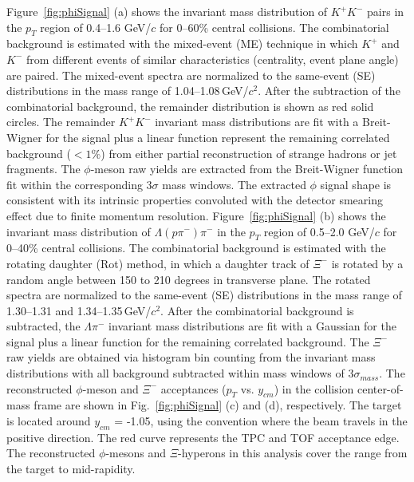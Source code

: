 \documentclass[%
 reprint,	
showpacs,
 amsmath,amssymb,
 aps,
 prc,
]{revtex4-1}
\begin{document}
Figure~\ref{fig:phiSignal} (a) shows the invariant mass distribution of $K^+K^-$ pairs in the $p_{T}$ region of 0.4--1.6 GeV/$c$ for 0--60\% central collisions. The combinatorial background is estimated with the mixed-event (ME) technique in which $K^+$ and $K^-$ from different events of similar characteristics (centrality, event plane angle) are paired. The mixed-event spectra are normalized to the same-event (SE) distributions in the mass range of 1.04--1.08\,GeV/$c^2$. After the subtraction of the combinatorial background, the remainder distribution is shown as red solid circles. The remainder $K^+K^-$ invariant mass distributions are fit with a Breit-Wigner for the signal plus a linear function represent the remaining correlated background ($< 1\%$) from either partial reconstruction of strange hadrons or jet fragments. The $\phi$-meson raw yields are extracted from the Breit-Wigner function fit within the corresponding 3$\sigma$ mass windows. The extracted $\phi$ signal shape is consistent with its intrinsic properties convoluted with the detector smearing effect due to finite momentum resolution.
Figure~\ref{fig:phiSignal} (b) shows the invariant mass distribution of $\Lambda(p\pi^-)\pi^-$ in the $p_{T}$ region of 0.5--2.0 GeV/$c$ for 0--40\% central collisions. The combinatorial background is estimated with the rotating daughter (Rot) method, in which a daughter track of $\Xi^-$ is rotated by a random angle between 150 to 210 degrees in transverse plane. The rotated spectra are normalized to the same-event (SE) distributions in the mass range of 1.30--1.31 and 1.34--1.35\,GeV/$c^2$. After the combinatorial background is subtracted, the $\Lambda\pi^-$ invariant mass distributions are fit with a Gaussian for the signal plus a linear function for the remaining correlated background. The $\Xi^-$ raw yields are obtained via histogram bin counting from the invariant mass distributions with all background subtracted within mass windows of 3$\sigma_{mass}$. The reconstructed $\phi$-meson and $\Xi^-$ acceptances ($p_T$ vs. $y_{cm}$) in the collision center-of-mass frame are shown in Fig.~\ref{fig:phiSignal} (c) and (d), respectively.
The target is located around $y_{cm}$ = -1.05, using the convention where the beam travels in the positive direction. The red curve represents the TPC and TOF acceptance edge. The reconstructed $\phi$-mesons and $\Xi$-hyperons in this analysis cover the range from the target to mid-rapidity.
\end{document}
